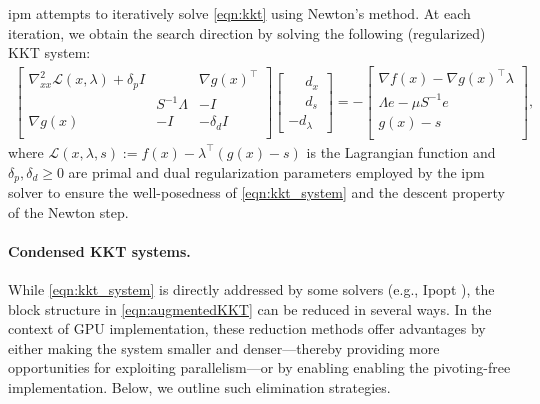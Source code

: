 \documentclass{article}
\begin{document}
\Gls*{ipm} attempts to iteratively solve \cref{eqn:kkt} using Newton's method. At each iteration, we obtain the search direction by solving the following (regularized) KKT system:
\begin{align}\label{eqn:kkt_system}
  \begin{bmatrix}
    \nabla^2_{x x} \mathcal{L}(x,\lambda) + \delta_p I & & \nabla g(x)^\top  \\
                                          & S^{-1}\Lambda & -I \\
    \nabla g(x) & -I &  - \delta_d I\\
  \end{bmatrix}
  \begin{bmatrix}
    \phantom{-}d_x\\
    \phantom{-}d_s \\
    -d_\lambda
  \end{bmatrix} =
  -\begin{bmatrix}
    \nabla f(x) - \nabla g(x)^\top \lambda\\
    \Lambda e - \mu S^{-1} e \\
    g(x) - s\\
  \end{bmatrix},
\end{align}
where $\mathcal{L}(x,\lambda,s) := f(x) - \lambda^\top (g(x)-s)$ is the Lagrangian function and $\delta_p, \delta_d \geq 0$ are primal and dual regularization parameters employed by the \gls*{ipm} solver to ensure the well-posedness of \cref{eqn:kkt_system} and the descent property of the Newton step.

\paragraph{Condensed KKT systems.}
While \cref{eqn:kkt_system} is directly addressed by some solvers (e.g., Ipopt \cite{wachterImplementationInteriorpointFilter2006}), the block structure in \cref{eqn:augmentedKKT} can be reduced in several ways. In the context of GPU implementation, these reduction methods offer advantages by either making the system smaller and denser—thereby providing more opportunities for exploiting parallelism—or by enabling enabling the pivoting-free implementation. Below, we outline such elimination strategies.
\end{document}
